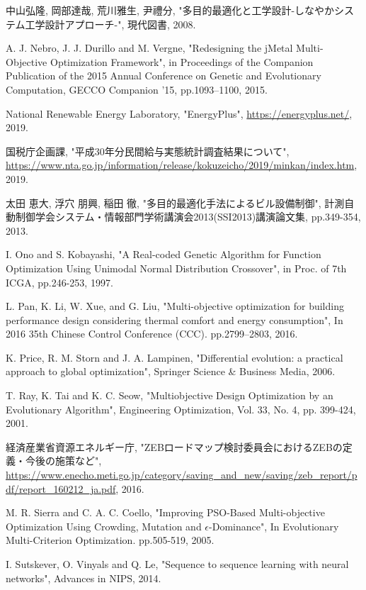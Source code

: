 \begin{thebibliography}{99}
     中山弘隆, 岡部達哉, 荒川雅生, 尹禮分, "多目的最適化と工学設計-しなやかシステム工学設計アプローチ-", 現代図書, 2008.

     A. J. Nebro, J. J. Durillo and M. Vergne, "Redesigning the jMetal Multi-Objective Optimization Framework", in Proceedings of the Companion Publication of the 2015 Annual Conference on Genetic and Evolutionary Computation, GECCO Companion ’15, pp.1093–1100, 2015.

     National Renewable Energy Laboratory, "EnergyPlus", \newblock \url{https://energyplus.net/}, 2019.

     国税庁企画課, "平成30年分民間給与実態統計調査結果について", \url{https://www.nta.go.jp/information/release/kokuzeicho/2019/minkan/index.htm}, 2019.

     太田 恵大, 浮穴 朋興, 稲田 徹, "多目的最適化手法によるビル設備制御", 計測自動制御学会システム・情報部門学術講演会2013(SSI2013)講演論文集, pp.349-354, 2013.

     I. Ono and S. Kobayashi, "A Real-coded Genetic Algorithm for Function Optimization Using Unimodal Normal Distribution Crossover", in Proc. of 7th ICGA, pp.246-253, 1997.

     L. Pan, K. Li, W. Xue, and G. Liu, "Multi-objective optimization for building performance design considering thermal comfort and energy consumption", In 2016 35th Chinese Control Conference (CCC). pp.2799–2803, 2016.

     K. Price, R. M. Storn and J. A. Lampinen, "Differential
    evolution: a practical approach to global optimization", Springer Science \& Business Media, 2006.

     T. Ray, K. Tai and K. C. Seow, "Multiobjective Design Optimization by an Evolutionary Algorithm", Engineering Optimization, Vol. 33, No. 4, pp. 399-424, 2001.

     経済産業省資源エネルギー庁, "ZEBロードマップ検討委員会におけるZEBの定義・今後の施策など", \url{https://www.enecho.meti.go.jp/category/saving_and_new/saving/zeb_report/pdf/report_160212_ja.pdf}, 2016.

     M. R. Sierra and C. A. C. Coello, "Improving PSO-Based Multi-objective Optimization Using Crowding, Mutation and $\epsilon$-Dominance", In Evolutionary Multi-Criterion Optimization. pp.505-519, 2005.

     I. Sutskever, O. Vinyals and Q. Le, "Sequence to sequence learning with neural networks", Advances in NIPS, 2014.


\end{thebibliography}
